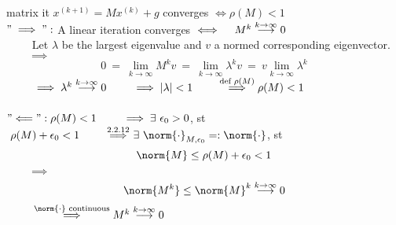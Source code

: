 
\begin{SolutionSheet}[\ref{sheet6}]
\begin{onehalfspace}
  
  \begin{Solution}
    \Claim matrix it $x^{(k+1)} = Mx^{(k)} + g$ converges $\iff \rho(M) < 1$\\
    \Proof $"\implies":$ A linear iteration converges $\iff \quad M^k \stackrel{k \to \infty}{\longrightarrow} 0$ \\
    $\phantom{\implies}$ Let $\lambda$ be the largest eigenvalue and $v$ a normed corresponding eigenvector. \\
    $\phantom{\implies} \implies $\begin{equation*}
      0 \ = \ \lim_{k \to \infty} M^k v \ = \ \lim_{k \to \infty} \lambda^k v \ = \ v \lim_{k \to \infty} \lambda^k
    \end{equation*}
    $\phantom{\implies} \implies \lambda^k \stackrel{k \to \infty}{\longrightarrow} 0 \\
    \phantom{\implies} \implies |\lambda| < 1 \\
    \phantom{\implies} \stackrel{\text{def } \rho(M)}{\implies} \rho(M) < 1$\\
    \\
    $"\Longleftarrow": \rho(M) < 1 \\
    \phantom{\implies} \implies \exists \ \epsilon_0 > 0$, st $\ \rho(M)+\epsilon_0 < 1 \\
    \phantom{\implies} \stackrel{\text{2.2.12}}{\implies} \exists \ \norm{\cdot}_{M,\epsilon_0} =: \norm{\cdot}$, st \begin{equation*}
      \norm{M} \leq \rho(M) + \epsilon_0 < 1 
    \end{equation*}
    $\phantom{\implies} \implies$\begin{equation*}
      \norm{M^k} \leq \norm{M}^k \conv{k} 0
    \end{equation*}
    $\phantom{\implies} \stackrel{\norm{\cdot} \text{ continuous}}{\implies} M^k \conv{k} 0$
  \end{Solution}


\end{onehalfspace}
\end{SolutionSheet}
